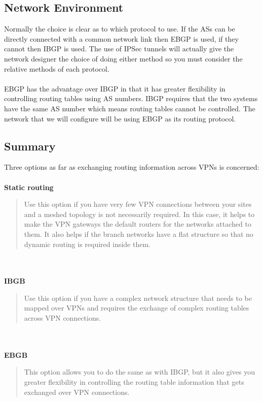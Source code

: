 \documentclass[10pt,a4paper]{article}
\begin{document}
\begin{itemize}
\begin{itemize}
\begin{itemize}
\subsection{Network Environment}
Normally the choice is clear as to which protocol to use. If the ASs can be directly
connected with a common network link then EBGP is used, if they cannot then
IBGP is used. The use of IPSec tunnels will actually give the network designer
the choice of doing either method so you must consider the relative methods of
each protocol. 
\\
\\
EBGP has the advantage over IBGP in that it has greater flexibility
in controlling routing tables using AS numbers. IBGP requires that the two
systems have the same AS number which means routing tables cannot be
controlled. The network that we will configure will be using EBGP as its routing protocol.

\subsection{Summary}

Three options as far as exchanging routing information across VPNs is concerned:
\\
\\
\textbf{Static routing}
\begin{quote}
Use this option if you have very few VPN connections
between your sites and a meshed topology is not
necessarily required. In this case, it helps to make the
VPN gateways the default routers for the networks
attached to them. It also helps if the branch networks
have a flat structure so that no dynamic routing is
required inside them.
\end{quote}
\\
\\
\textbf{IBGB}
\begin{quote}
Use this option if you have a complex network structure
that needs to be mapped over VPNs and requires the
exchange of complex routing tables across VPN
connections.
\end{quote}

\\
\\
\textbf{EBGB}
\begin{quote}
This option allows you to do the same as with IBGP, but it
also gives you greater flexibility in controlling the routing
table information that gets exchanged over VPN
connections.
\end{quote}
\newpage

\end{itemize}
\end{itemize}
\end{itemize}
\end{document}
